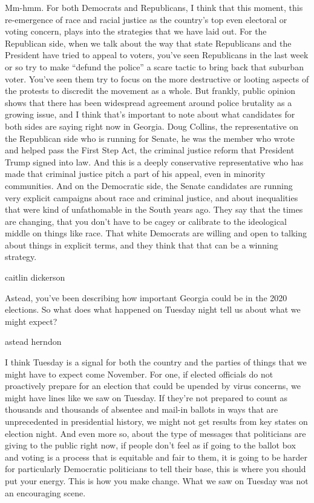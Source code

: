 Mm-hmm. For both Democrats and Republicans, I think that this moment,
this re-emergence of race and racial justice as the country's top even
electoral or voting concern, plays into the strategies that we have laid
out. For the Republican side, when we talk about the way that state
Republicans and the President have tried to appeal to voters, you've
seen Republicans in the last week or so try to make ``defund the
police'' a scare tactic to bring back that suburban voter. You've seen
them try to focus on the more destructive or looting aspects of the
protests to discredit the movement as a whole. But frankly, public
opinion shows that there has been widespread agreement around police
brutality as a growing issue, and I think that's important to note about
what candidates for both sides are saying right now in Georgia. Doug
Collins, the representative on the Republican side who is running for
Senate, he was the member who wrote and helped pass the First Step Act,
the criminal justice reform that President Trump signed into law. And
this is a deeply conservative representative who has made that criminal
justice pitch a part of his appeal, even in minority communities. And on
the Democratic side, the Senate candidates are running very explicit
campaigns about race and criminal justice, and about inequalities that
were kind of unfathomable in the South years ago. They say that the
times are changing, that you don't have to be cagey or calibrate to the
ideological middle on things like race. That white Democrats are willing
and open to talking about things in explicit terms, and they think that
that can be a winning strategy.

caitlin dickerson

Astead, you've been describing how important Georgia could be in the
2020 elections. So what does what happened on Tuesday night tell us
about what we might expect?

astead herndon

I think Tuesday is a signal for both the country and the parties of
things that we might have to expect come November. For one, if elected
officials do not proactively prepare for an election that could be
upended by virus concerns, we might have lines like we saw on Tuesday.
If they're not prepared to count as thousands and thousands of absentee
and mail-in ballots in ways that are unprecedented in presidential
history, we might not get results from key states on election night. And
even more so, about the type of messages that politicians are giving to
the public right now, if people don't feel as if going to the ballot box
and voting is a process that is equitable and fair to them, it is going
to be harder for particularly Democratic politicians to tell their base,
this is where you should put your energy. This is how you make change.
What we saw on Tuesday was not an encouraging scene.

